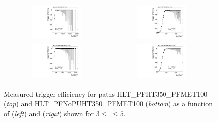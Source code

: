 \begin{figure}[!t]
  \centering
  \begin{tabular}{cc}
                \includegraphics[width=0.49\textwidth]{figures/turn_on_HT_TagEle27WP80_ProbePFHT350PFMET100_MHT200_chs_NJets3-5.pdf} &
                \includegraphics[width=0.49\textwidth]{figures/turn_on_MHT_TagEle27WP80_ProbePFHT350PFMET100_HT500_chs_NJets3-5.pdf} \\
                \includegraphics[width=0.49\textwidth]{figures/turn_on_HT_TagEle27WP80_ProbePFNoPUHT350PFMET100_MHT200_chs_NJets3-5.pdf} &
                \includegraphics[width=0.49\textwidth]{figures/turn_on_MHT_TagEle27WP80_ProbePFNoPUHT350PFMET100_HT500_chs_NJets3-5.pdf} \\
  \end{tabular}
\caption{Measured trigger efficiency for paths HLT\_PFHT350\_PFMET100 (\textit{top}) and HLT\_PFNoPUHT350\_PFMET100 (\textit{bottom}) as a function of \HT (\textit{left}) and \MHT (\textit{right}) shown for $3 \leq$ \NJets $\leq 5$.} 
  \label{fig:trig_eff_3njets5}
\end{figure}

